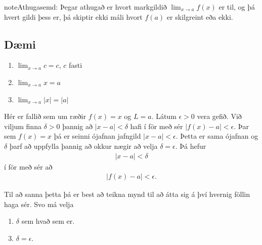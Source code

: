 \documentclass[b5paper,10pt,icelandic]{sphinxmanual}
\begin{document}
\begin{sphinxadmonition}{note}{Athugasemd:}
Þegar athugað er hvort markgildið \(\lim_{x\rightarrow a} f(x)\) er
til, og þá hvert gildi þess er, þá skiptir ekki máli hvort \(f(a)\) er
skilgreint eða ekki.
\end{sphinxadmonition}


\subsection{Dæmi}
\label{\detokenize{kafli02:daemi}}\label{\detokenize{kafli02:daemi2-1}}\begin{enumerate}
\item {} 
\(\lim_{x \to a} c = c\), \(c\) fasti

\item {} 
\(\lim_{x \to a} x = a\)

\item {} 
\(\lim_{x \to a} |x| = |a|\)

\end{enumerate}

Hér er fallið sem um ræðir \(f(x) = x\) og \(L=a\).
Látum \(\epsilon>0\) vera gefið. Við viljum finna
\(\delta >0\) þannig að \(|x-a|<\delta\) hafi í för
með sér \(|f(x)-a| < \epsilon\). Þar sem \(f(x)=x\) þá er seinni
ójafnan jafngild \(|x-a|<\epsilon\). Þetta er sama ójafnan og
\(\delta\) þarf að uppfylla þannig að okkur nægir að velja
\(\delta = \epsilon\). Þá hefur
\begin{equation*}
\begin{split}|x-a| < \delta\end{split}
\end{equation*}
í för með sér að
\begin{equation*}
\begin{split}|f(x) -a| < \epsilon.\end{split}
\end{equation*}

Til að sanna þetta þá er best að teikna mynd til að átta sig á því hvernig
föllin haga sér. Svo má velja
\begin{enumerate}
\item {} 
\(\delta\) sem hvað sem er.

\end{enumerate}
\begin{enumerate}
\setcounter{enumi}{2}
\item {} 
\(\delta=\epsilon\).

\end{enumerate}
\end{document}
